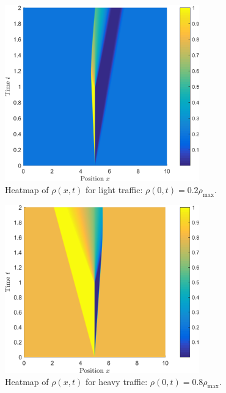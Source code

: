 \documentclass[11pt]{article}
\begin{document}
\begin{figure}[h!]
  \centering
  \includegraphics[width=0.75\textwidth]{1b_light_surf.png}
  \caption{Heatmap of $\rho(x,t)$ for light traffic: $\rho(0,t) = 0.2\rho_\mathrm{max}$.}
  \label{fig:1b_light_surf}
\end{figure}

\begin{figure}[h!]
  \centering
  \includegraphics[width=0.75\textwidth]{1b_heavy_surf.png}
  \caption{Heatmap of $\rho(x,t)$ for heavy traffic: $\rho(0,t) = 0.8\rho_\mathrm{max}$.}
  \label{fig:1b_heavy_surf}
\end{figure}

\end{document}
